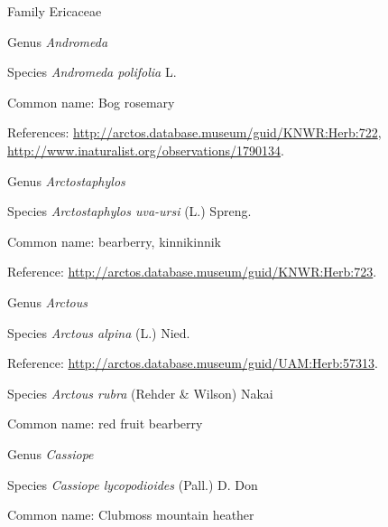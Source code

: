 \documentclass[9pt, article]{memoir}
\begin{document}
\begin{multicols}{2}
\vspace{6pt}\noindent\hspace{24pt}Family Ericaceae


\vspace{6pt}\noindent\hspace{30pt}Genus \textit{Andromeda}


\vspace{6pt}\noindent\hspace{36pt}Species \textit{Andromeda polifolia} L.


Common name: Bog rosemary

References: 
\url{http://arctos.database.museum/guid/KNWR:Herb:722}, 
\url{http://www.inaturalist.org/observations/1790134}.

\vspace{6pt}\noindent\hspace{30pt}Genus \textit{Arctostaphylos}


\vspace{6pt}\noindent\hspace{36pt}Species \textit{Arctostaphylos uva-ursi} (L.) Spreng.


Common name: bearberry, kinnikinnik

Reference: 
\url{http://arctos.database.museum/guid/KNWR:Herb:723}.

\vspace{6pt}\noindent\hspace{30pt}Genus \textit{Arctous}


\vspace{6pt}\noindent\hspace{36pt}Species \textit{Arctous alpina} (L.) Nied.


Reference: 
\url{http://arctos.database.museum/guid/UAM:Herb:57313}.

\vspace{6pt}\noindent\hspace{36pt}Species \textit{Arctous rubra} (Rehder \& Wilson) Nakai


Common name: red fruit bearberry

\vspace{6pt}\noindent\hspace{30pt}Genus \textit{Cassiope}


\vspace{6pt}\noindent\hspace{36pt}Species \textit{Cassiope lycopodioides} (Pall.) D. Don


Common name: Clubmoss mountain heather


\end{multicols}
\end{document}
